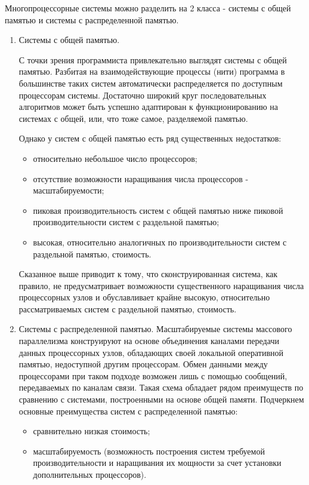 Многопроцессорные системы можно разделить на 2 класса - системы с общей памятью
и системы с распределенной памятью.
\begin{enumerate}
\item  Системы с общей памятью. 

С точки зрения программиста привлекательно выглядят системы с общей памятью.
Разбитая на взаимодействующие процессы (нити) программа в большинстве таких
систем автоматически распределяется по доступным процессорам системы. Достаточно
широкий круг последовательных алгоритмов может быть успешно адаптирован к
функционированию на системах с общей, или, что тоже самое, разделяемой памятью.

Однако у систем с общей памятью есть ряд существенных недостатков:
\begin{itemize}
\item относительно небольшое число процессоров;
\item отсутствие возможности наращивания числа процессоров - масштабируемости;
\item пиковая производительность систем с общей памятью ниже пиковой
производительности систем с раздельной памятью;
\item высокая, относительно аналогичных по производительности систем с
раздельной памятью, стоимость.
\end{itemize}
Сказанное выше приводит к тому, что сконструированная система, как правило, не
предусматривает возможности существенного наращивания числа процессорных узлов и
обуславливает крайне высокую, относительно рассматриваемых систем с раздельной
памятью, стоимость.
 
\item Системы с распределенной памятью.
 Масштабируемые системы массового параллелизма конструируют на основе
объединения каналами передачи данных процессорных узлов, обладающих своей
локальной оперативной памятью, недоступной другим процессорам. Обмен данными
между процессорами при таком подходе возможен лишь с помощью сообщений,
передаваемых по каналам связи. Такая схема обладает рядом преимуществ по
сравнению с системами, построенными на основе общей памяти. Подчеркнем основные
преимущества систем с распределенной памятью:
\begin{itemize}
\item сравнительно низкая стоимость;
\item масштабируемость (возможность построения систем требуемой
производительности и наращивания их мощности за счет установки дополнительных
процессоров).
\end{itemize}


\end{enumerate}
